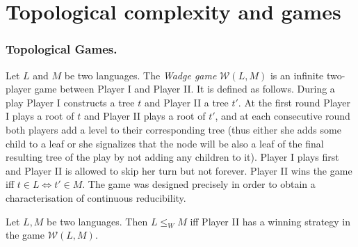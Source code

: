 
\section{Topological complexity and games}\label{section:games}

\subsubsection*{Topological Games.}
Let $L$ and $M$ be two languages. The {\em Wadge game}
$\mathcal{W}(L, M)$ is an infinite two-player game between Player I and Player II. It is defined as follows. During a play Player I constructs a tree $t$ and Player II a tree $t'$. At the first round Player I plays a root of $t$ and Player II plays a root of $t'$, and at each consecutive round both players add a level
to their corresponding tree (thus either she adds some child to a leaf or she signalizes that the node will be also a leaf of the final resulting tree of the play by not adding any children to it).
Player I plays first and Player II is allowed to
skip her turn but not forever.  Player II wins the game iff $t \in L
\Leftrightarrow t' \in M$.  
The game was designed precisely in order to obtain a characterisation of continuous reducibility.
\begin{lemma}\label{lemma:wadge}
Let $L, M$ be two languages. Then  $L \leq_W M$ iff Player II has a winning strategy in the game $\mathcal{W}(L, M)$.
\end{lemma}


